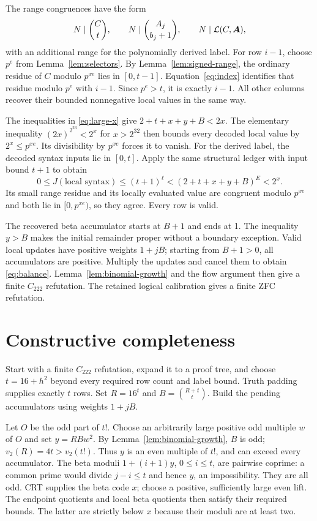 \documentclass[11pt]{article}
\theoremstyle{remark}\newtheorem{remark}[theorem]{Remark}
\begin{document}
The range congruences have the form
\[
 N\mid\binom Ct,\qquad
 N\mid\binom{A_j}{b_j+1},\qquad
 N\mid\mathcal L(C,\boldsymbol A),
\]
with an additional range for the polynomially derived label. For row
$i-1$, choose $p^e$ from Lemma~\ref{lem:selectors}. By
Lemma~\ref{lem:signed-range}, the ordinary residue of $C$ modulo
$p^{xe}$ lies in $[0,t-1]$. Equation~\eqref{eq:index} identifies
that residue modulo $p^e$ with $i-1$. Since $p^e>t$, it is exactly
$i-1$. All other columns recover their bounded nonnegative local
values in the same way.

The inequalities in \eqref{eq:large-x} give
$2+t+x+y+B<2x$. The elementary inequality
$(2x)^{2^{23}}<2^x$ for $x>2^{32}$ then bounds every decoded local
value by $2^x\le p^{xe}$. Its divisibility by $p^{xe}$ forces it to
vanish. For the derived label, the decoded syntax inputs lie in
$[0,t]$. Apply the same structural ledger with input bound $t+1$ to
obtain
\[
 0\le J(\text{local syntax})\le(t+1)^\ell
 <(2+t+x+y+B)^E<2^x.
\]
Its small range residue and its locally evaluated value are congruent
modulo $p^{xe}$ and both lie in $[0,p^{xe})$, so they agree.
Every row is valid.

The recovered beta accumulator starts at $B+1$ and ends at 1.
The inequality $y>B$ makes the initial remainder proper without a
boundary exception. Valid local updates have positive weights $1+jB$;
starting from $B+1>0$, all accumulators are positive. Multiply the
updates and cancel them to obtain \eqref{eq:balance}. Lemma~\ref{lem:binomial-growth}
and the flow argument then give a finite $C_{222}$ refutation. The
retained logical calibration gives a finite ZFC refutation.

\section{Constructive completeness}

Start with a finite $C_{222}$ refutation, expand it to a proof tree,
and choose $t=16+h^2$ beyond every required row count and label bound.
Truth padding supplies exactly $t$ rows. Set $R=16^t$ and
$B=\binom{R+t}{t}$. Build the pending accumulators using weights
$1+jB$.

Let $O$ be the odd part of $t!$. Choose an arbitrarily large positive
odd multiple $w$ of $O$ and set $y=RBw^2$. By
Lemma~\ref{lem:binomial-growth}, $B$ is odd; $v_2(R)=4t>v_2(t!)$.
Thus $y$ is an even multiple of $t!$, and can exceed every accumulator.
The beta moduli $1+(i+1)y$, $0\le i\le t$, are pairwise coprime:
a common prime would divide $j-i\le t$ and hence $y$, an impossibility.
They are all odd. CRT supplies the beta code $x$; choose a positive,
sufficiently large even lift. The endpoint quotients and local beta
quotients then satisfy their required bounds. The latter are strictly
below $x$ because their moduli are at least two.
\end{document}
